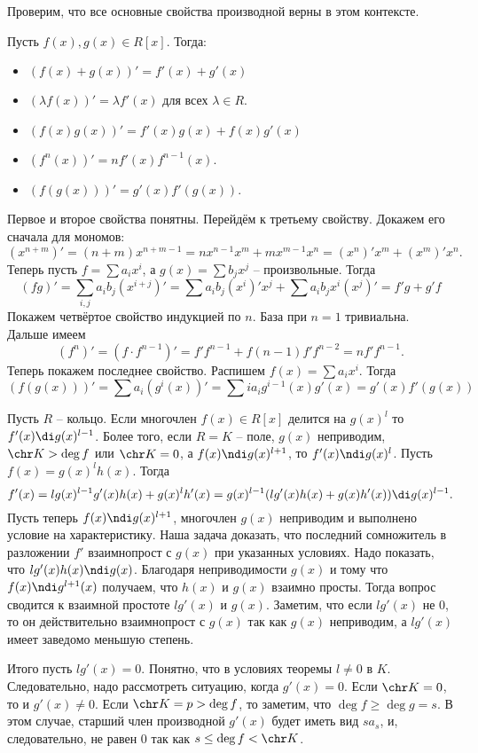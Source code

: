 Проверим, что все основные свойства производной верны в этом контексте.

\thrm[Свойства] Пусть $f(x),g(x) \in R[x]$. Тогда:
\begin{itemize}
\item $(f(x)+g(x))'= f'(x)+g'(x)$
\item $(\lambda f(x))'=\lambda f'(x)$ для всех $\lambda \in R$.
\item  $(f(x)g(x))'=f'(x)g(x)+f(x)g'(x)$
\item $(f^n(x))'=nf'(x)f^{n-1}(x)$.
\item $(f(g(x)))'=g'(x)f'(g(x))$.
\end{itemize}
\ethrm
\proof Первое и второе свойства понятны. Перейдём к третьему свойству. Докажем его сначала для мономов:
$$(x^{n+m})'=(n+m)x^{n+m-1}=nx^{n-1}x^{m}+mx^{m-1}x^n=(x^n)'x^m+(x^{m})'x^n.$$
Теперь пусть $f=\sum a_i x^i$, а $g(x)=\sum b_j x^j$ -- произвольные. Тогда 
$$(fg)'= 
\sum_{i,j} a_ib_j (x^{i+j})'= \sum a_ib_j (x^i)'x^j + \sum a_ib_j x^i(x^j)'=f'g+g'f$$ 
Покажем четвёртое свойство индукцией по $n$. База при $n=1$ тривиальна. Дальше имеем 
$$(f^n)'=(f\cdot f^{n-1})'=f'f^{n-1}+f(n-1)f'f^{n-2}=nf'f^{n-1}.$$
Теперь покажем последнее свойство. Распишем $f(x)=\sum a_i x^i$. Тогда $$(f(g(x)))'=\sum a_i (g^i(x))'= \sum i a_i g^{i-1}(x) g'(x)= g'(x) f'(g(x))$$


\endproof

\thrm Пусть $R$ -- кольцо. Если многочлен $f(x) \in R[x]$ делится на $g(x)^l$ то $f'(x) \di g(x)^{l-1}$. Более того, если $R=K$ -- поле, $g(x)$ неприводим, $\chr K > \deg f$ или $\chr K=0$, а $f(x) \ndi g(x)^{l+1}$, то $f'(x)\ndi g(x)^{l}$.
\ethrm
\proof Пусть $f(x)=g(x)^lh(x)$. Тогда $$f'(x)=lg(x)^{l-1}g'(x)h(x)+g(x)^lh'(x)=g(x)^{l-1}(lg'(x)h(x)+g(x)h'(x)) \di g(x)^{l-1}.$$
Пусть теперь $f(x) \ndi g(x)^{l+1}$, многочлен $g(x)$ неприводим и выполнено условие на характеристику. Наша задача доказать, что последний сомножитель в разложении $f'$ взаимнопрост с $g(x)$ при указанных условиях. Надо показать, что $lg'(x)h(x)\ndi g(x)$. Благодаря неприводимости $g(x)$  и тому что $f(x)\ndi g^{l+1}(x)$ получаем, что $h(x)$ и $g(x)$ взаимно просты.   Тогда вопрос сводится к взаимной простоте $lg'(x)$ и $g(x)$. Заметим, что если $lg'(x)$ не 0, то он действительно взаимнопрост с $g(x)$ так как $g(x)$ неприводим, а $lg'(x)$ имеет заведомо меньшую степень. 

Итого пусть $lg'(x)=0$. Понятно, что в условиях теоремы $l\neq 0$ в $K$. Следовательно, надо рассмотреть ситуацию, когда $g'(x)=0$.
Если $\chr K =0$, то и $g'(x)\neq 0$. Если $\chr K =p>\deg f$, то заметим, что $\deg f \geq \deg g=s$. В этом случае, старший член производной $g'(x)$ будет иметь вид $sa_s$, и, следовательно, не равен 0 так как $s\leq \deg f < \chr K$. 
\endproof


